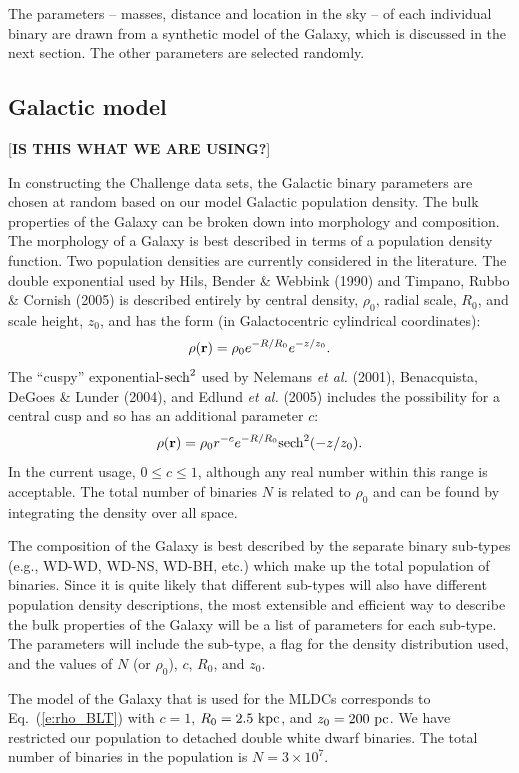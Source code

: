 \documentclass[12pt]{iopart}
\def\be{\begin{equation}}
\def\ee{\end{equation}}
\begin{document}
The parameters -- masses, distance and location in the sky -- of each individual binary are drawn from a synthetic model of the Galaxy, which is discussed in the next section. The other parameters are selected randomly.

\subsection{Galactic model}
\label{ss:galaxy}
[{\bf IS THIS WHAT WE ARE USING?}]

In constructing the Challenge data sets, the Galactic binary parameters are chosen at random based on our model Galactic population density. The bulk properties of the Galaxy can be broken down into morphology and composition. The morphology of a Galaxy is best described in terms of a population density function. Two population densities are currently considered in the literature. The double exponential used by Hils, Bender \& Webbink (1990) and Timpano, Rubbo \& Cornish (2005) is described entirely by central density, $\rho_0$, radial scale, $R_0$, and scale height, $z_0$, and has the form (in Galactocentric cylindrical coordinates):
\begin{equation}
\rho({\bf r}) = \rho_0 e^{-R/R_0} e^{-z/z_0}. 
\end{equation}
The ``cuspy'' exponential-${\rm sech}^2$ used by Nelemans {\it et al.} (2001), Benacquista, DeGoes \& Lunder (2004), and Edlund {\it et al.} (2005) includes the possibility for a central cusp and so has an additional parameter $c$:
\be
\rho({\bf r}) = \rho_0 r^{-c} e^{-R/R_0} {\rm sech}^2(-z/z_0).
\label{e:rho_BLT}
\ee
In the current usage, $0\le c \le 1$, although any real number within this range is acceptable. The total number of binaries $N$ is related to $\rho_0$ and can be found by integrating the density over all space.

The composition of the Galaxy is best described by the separate binary sub-types (e.g., WD-WD, WD-NS, WD-BH, etc.) which make up the total population of binaries. Since it is quite likely that different sub-types will also have different population density descriptions, the most extensible and efficient way to describe the bulk properties of the Galaxy will be a list of parameters for each sub-type. The parameters will include the sub-type, a flag for the density distribution used, and the values of $N$ (or $\rho_0$), $c$, $R_0$, and $z_0$.

The model of the Galaxy that is used for the MLDCs corresponds to Eq.~(\ref{e:rho_BLT}) with $c = 1$, $R_0 = 2.5~{\rm  kpc}$, and $z_0 = 200~{\rm pc}$. We have restricted  our population to detached double white dwarf binaries. The total number of binaries in the population is $N = 3 \times 10^7$.
\end{document}
